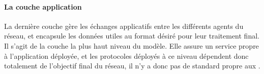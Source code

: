             \paragraph{La couche application}
La dernière couche gère les échanges applicatifs entre les différents agents du réseau, et encapsule les données utiles au format désiré pour leur traitement final.
Il s'agit de la couche la plus haut niveau  du modèle.
Elle assure un service propre à l'application déployée, et les protocoles déployés à ce niveau dépendent donc totalement de l'objectif final du réseau, il n'y a donc pas de standard propre aux \rcs.
